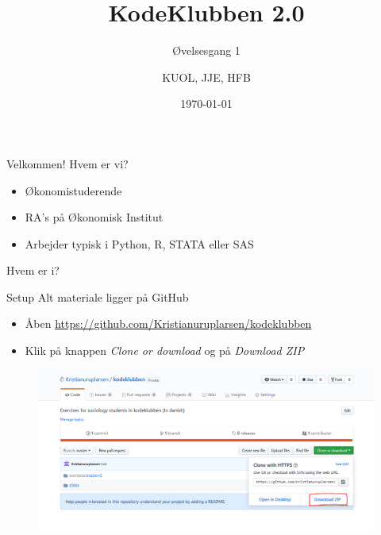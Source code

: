 \documentclass[10pt]{beamer}
\title{KodeKlubben 2.0}
\subtitle{Øvelsesgang 1}
\date{\today}
\author{KUOL, JJE, HFB}
\institute{Økonomisk Institut, KU}
\begin{document}
\maketitle

\begin{frame}[fragile]{Velkommen!}
Hvem er vi?
\pause
\begin{itemize}
  \item Økonomistuderende
  \item RA's på Økonomisk Institut
  \item Arbejder typisk i Python, R, STATA eller SAS
\end{itemize}
\pause
Hvem er i?
\end{frame}

\begin{frame}[fragile]{Setup}
  Alt materiale ligger på GitHub
\begin{itemize}
  \item Åben \href{https://github.com/Kristianuruplarsen/kodeklubben}{https://github.com/Kristianuruplarsen/kodeklubben}
  \item Klik på knappen \textit{Clone or download} og på \textit{Download ZIP}
\end{itemize}

\begin{figure}
  \center
  \includegraphics[width=\textwidth]{figs/setup.PNG}
\end{figure}
\end{frame}
\end{document}
